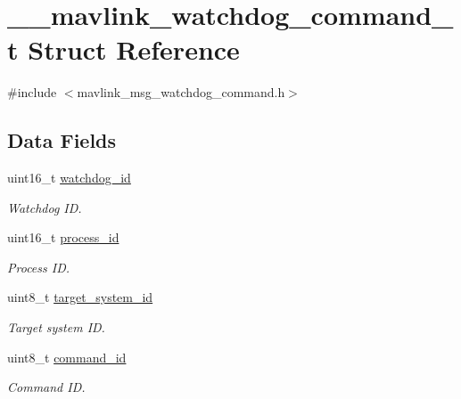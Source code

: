 \hypertarget{struct____mavlink__watchdog__command__t}{\section{\+\_\+\+\_\+mavlink\+\_\+watchdog\+\_\+command\+\_\+t Struct Reference}
\label{struct____mavlink__watchdog__command__t}
}


{\ttfamily \#include $<$mavlink\+\_\+msg\+\_\+watchdog\+\_\+command.\+h$>$}

\subsection*{Data Fields}
\begin{DoxyCompactItemize}
\item 
uint16\+\_\+t \hyperlink{struct____mavlink__watchdog__command__t_adeccc76ded28d25b7702181985dfc0c0}{watchdog\+\_\+id}
\begin{DoxyCompactList}\small\item\em Watchdog I\+D. \end{DoxyCompactList}\item 
uint16\+\_\+t \hyperlink{struct____mavlink__watchdog__command__t_adb07af761d8e53c3622b7b86aea3149f}{process\+\_\+id}
\begin{DoxyCompactList}\small\item\em Process I\+D. \end{DoxyCompactList}\item 
uint8\+\_\+t \hyperlink{struct____mavlink__watchdog__command__t_a8ecaf54c76f5158e9ada539b91700e4c}{target\+\_\+system\+\_\+id}
\begin{DoxyCompactList}\small\item\em Target system I\+D. \end{DoxyCompactList}\item 
uint8\+\_\+t \hyperlink{struct____mavlink__watchdog__command__t_a1be4a080c93a511a2cbe70af8433e369}{command\+\_\+id}
\begin{DoxyCompactList}\small\item\em Command I\+D. \end{DoxyCompactList}\end{DoxyCompactItemize}


